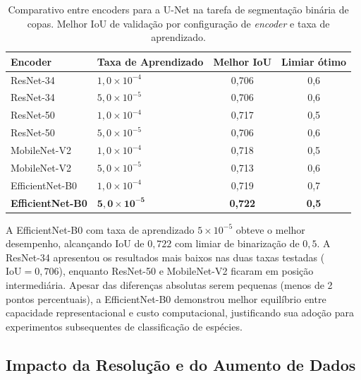\begin{table}[H]
    \centering
    \caption[Comparativo de encoders da U-Net]{Comparativo entre encoders para a U-Net na tarefa de segmentação binária de copas. Melhor IoU de validação por configuração de \textit{encoder} e taxa de aprendizado.}
    \label{tab:benchmark_encoders}
    \begin{tabular}{llcc}
        \toprule
        \textbf{Encoder}         & \textbf{Taxa de Aprendizado} & \textbf{Melhor IoU} & \textbf{Limiar ótimo} \\
        \midrule
        ResNet-34                & $1{,}0 \times 10^{-4}$       & 0,706               & 0,6 \\
        ResNet-34                & $5{,}0 \times 10^{-5}$       & 0,706               & 0,6 \\
        ResNet-50                & $1{,}0 \times 10^{-4}$       & 0,717               & 0,5 \\
        ResNet-50                & $5{,}0 \times 10^{-5}$       & 0,706               & 0,6 \\
        MobileNet-V2             & $1{,}0 \times 10^{-4}$       & 0,718               & 0,5 \\
        MobileNet-V2             & $5{,}0 \times 10^{-5}$       & 0,713               & 0,6 \\
        EfficientNet-B0          & $1{,}0 \times 10^{-4}$       & 0,719               & 0,7 \\
        \textbf{EfficientNet-B0} & $\mathbf{5{,}0 \times 10^{-5}}$ & \textbf{0,722}  & \textbf{0,5} \\
        \bottomrule
    \end{tabular}
\end{table}

A EfficientNet-B0 com taxa de aprendizado $5 \times 10^{-5}$ obteve o melhor desempenho, alcançando IoU de $0{,}722$ com limiar de binarização de $0{,}5$. A ResNet-34 apresentou os resultados mais baixos nas duas taxas testadas ($\text{IoU} = 0{,}706$), enquanto ResNet-50 e MobileNet-V2 ficaram em posição intermediária. Apesar das diferenças absolutas serem pequenas (menos de 2 pontos percentuais), a EfficientNet-B0 demonstrou melhor equilíbrio entre capacidade representacional e custo computacional, justificando sua adoção para experimentos subsequentes de classificação de espécies.

\subsection{Impacto da Resolução e do Aumento de Dados}\label{sec:res_aug}

